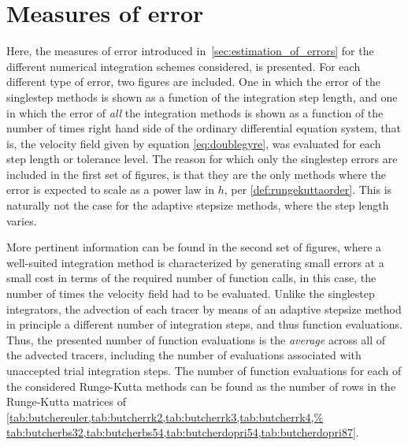 \section{Measures of error}
\label{sec:measures_of_error}

Here, the measures of error introduced in~\cref{sec:estimation_of_errors} for
the different numerical integration schemes considered, is presented. For
each different type of error, two figures are included. One in which the error
of the singlestep methods is shown as a function of the integration step length,
and one in which the error of \emph{all} the integration methods is shown
as a function of the number of times right hand side of the ordinary
differential equation system, that is, the velocity field given by equation
\eqref{eq:doublegyre}, was evaluated for each step length or tolerance level.
The reason for which only the singlestep errors are included in the first set of
figures, is that they are the only methods where the error is expected to scale
as a power law in $h$, per \cref{def:rungekuttaorder}. This is naturally not the
case for the adaptive stepsize methods, where the step length varies.

More pertinent information can be found in the second set of figures, where
a well-suited integration method is characterized by generating small
errors at a small cost in terms of the required number of function calls,
in this case, the number of times the velocity field had to be evaluated.
Unlike the singlestep integrators, the advection of each tracer by means
of an adaptive stepsize method in principle a different number of integration
steps, and thus function evaluations. Thus, the presented number of function
evaluations is the \emph{average} across all of the advected tracers, including
the number of evaluations associated with unaccepted trial integration steps.
The number of function evaluations for each of the considered Runge-Kutta
methods can be found as the number of rows in the Runge-Kutta matrices
of
\cref{tab:butchereuler,tab:butcherrk2,tab:butcherrk3,tab:butcherrk4,%
tab:butcherbs32,tab:butcherbs54,tab:butcherdopri54,tab:butcherdopri87}.






